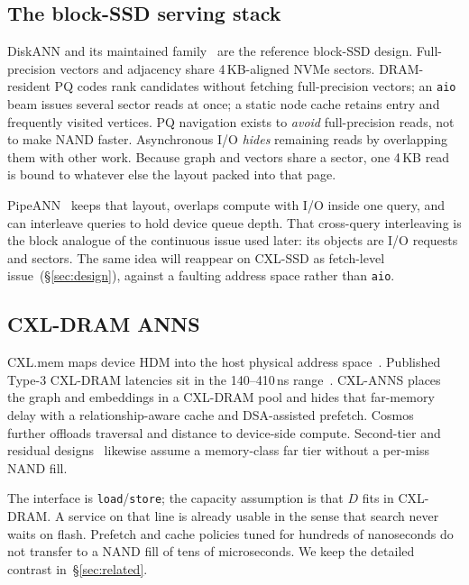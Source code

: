 \subsection{The block-SSD serving stack}
\label{sec:bg-block}

DiskANN and its maintained family~\cite{diskann,freshdiskann,diskannlib} are the reference block-SSD design.
Full-precision vectors and adjacency share 4\,KB-aligned NVMe sectors.
DRAM-resident PQ codes rank candidates without fetching full-precision
vectors; an
\texttt{aio} beam issues several sector reads at once; a static node
cache retains entry and frequently visited vertices. PQ navigation exists to \emph{avoid}
full-precision reads, not to make NAND faster. Asynchronous I/O
\emph{hides} remaining reads by overlapping them with other work.
Because graph and vectors share a sector, one 4\,KB read is bound to
whatever else the layout packed into that page.

PipeANN~\cite{pipeann} keeps that layout, overlaps compute with I/O
inside one query, and can interleave queries to hold device queue
depth. That cross-query interleaving is the block analogue of the
continuous issue used later: its objects are I/O requests and sectors.
The same idea will reappear on CXL-SSD as fetch-level
issue~(\S\ref{sec:design}), against a faulting address space rather
than \texttt{aio}.

\subsection{CXL-DRAM ANNS}
\label{sec:bg-cxl-dram}

CXL.mem maps device HDM into the host physical address
space~\cite{cxl31}. Published Type-3 CXL-DRAM latencies sit in the
140--410\,ns range~\cite{demystifycxl,cxlanns}. CXL-ANNS places the
graph and embeddings in a CXL-DRAM pool and hides that far-memory
delay with a relationship-aware cache and DSA-assisted prefetch.
Cosmos~\cite{cosmos} further offloads traversal and distance to
device-side compute. Second-tier and residual
designs~\cite{secondtier,fatrq,hm-ann} likewise assume a memory-class
far tier without a per-miss NAND fill.

The interface is \texttt{load}/\texttt{store}; the capacity assumption
is that $D$ fits in CXL-DRAM. A service on that line is already
usable in the sense that search never waits on flash. Prefetch and
cache policies tuned for hundreds of nanoseconds do not transfer to a
NAND fill of tens of microseconds. We keep the detailed contrast
in~\S\ref{sec:related}.

